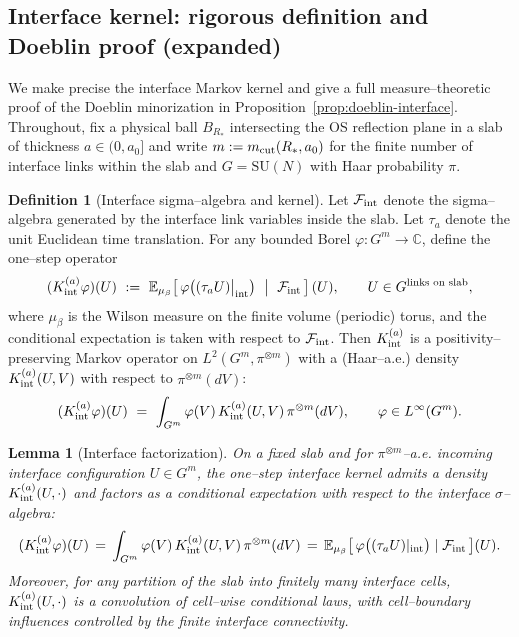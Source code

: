 \documentclass[11pt]{amsart}
\theoremstyle{plain}
\newtheorem{lemma}[theorem]{Lemma}
\theoremstyle{definition}
\newtheorem{definition}[theorem]{Definition}
\theoremstyle{remark}
\begin{document}
\subsection*{Interface kernel: rigorous definition and Doeblin proof (expanded)}
We make precise the interface Markov kernel and give a full measure–theoretic proof of the Doeblin minorization in Proposition~\ref{prop:doeblin-interface}. Throughout, fix a physical ball $B_{R_*}$ intersecting the OS reflection plane in a slab of thickness $a\in(0,a_0]$ and write $m:=m_{\rm cut}(R_*,a_0)$ for the finite number of interface links within the slab and $G=\mathrm{SU}(N)$ with Haar probability $\pi$.

\begin{definition}[Interface sigma--algebra and kernel]\label{def:interface-kernel}
Let $\mathcal{F}_{\rm int}$ denote the sigma--algebra generated by the interface link variables inside the slab. Let $\tau_a$ denote the unit Euclidean time translation. For any bounded Borel $\varphi:G^m\to\mathbb{C}$, define the one--step operator
\[
  (K_{\rm int}^{(a)}\varphi)(U)\ :=\ \mathbb{E}_{\mu_{\beta}}\!\left[\,\varphi\big( (\tau_a U)\big|_{\rm int}\big)\ \bigm|\ \mathcal{F}_{\rm int}\,\right](U),\qquad U\in G^{\text{links on slab}},
\]
where $\mu_{\beta}$ is the Wilson measure on the finite volume (periodic) torus, and the conditional expectation is taken with respect to $\mathcal{F}_{\rm int}$. Then $K_{\rm int}^{(a)}$ is a positivity–preserving Markov operator on $L^2(G^m,\pi^{\otimes m})$ with a (Haar–a.e.) density $K_{\rm int}^{(a)}(U,V)$ with respect to $\pi^{\otimes m}(dV)$:
\[
  (K_{\rm int}^{(a)}\varphi)(U)\ =\ \int_{G^m} \varphi(V)\,K_{\rm int}^{(a)}(U,V)\,\pi^{\otimes m}(dV),\qquad \varphi\in L^\infty(G^m).
\]
\end{definition}
\begin{lemma}[Interface factorization]\label{lem:interface-factorization}
On a fixed slab and for $\pi^{\otimes m}$--a.e. incoming interface configuration $U\in G^m$, the one--step interface kernel admits a density $K_{\rm int}^{(a)}(U,\cdot)$ and factors as a conditional expectation with respect to the interface $\sigma$--algebra:
\[
  (K_{\rm int}^{(a)}\varphi)(U)
    \,=\, \int_{G^m} \varphi(V)\,K_{\rm int}^{(a)}(U,V)\,\pi^{\otimes m}(dV)
    \,=\, \mathbb E_{\mu_\beta}\big[\,\varphi\big((\tau_a U)|_{\rm int}\big)\mid \mathcal F_{\rm int}\,\big](U).
\]
Moreover, for any partition of the slab into finitely many interface cells, $K_{\rm int}^{(a)}(U,\cdot)$ is a convolution of cell–wise conditional laws, with cell–boundary influences controlled by the finite interface connectivity.
\end{lemma}
\end{document}
